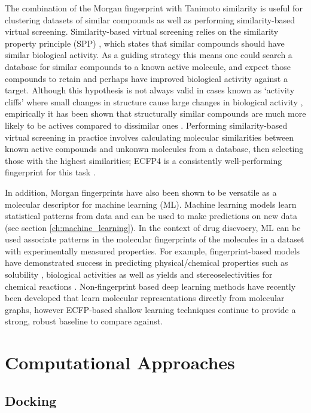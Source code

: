 The combination of the Morgan fingerprint with Tanimoto similarity is useful for clustering \cite{Butina1999Clustering} datasets of similar compounds as well as performing similarity-based virtual screening. Similarity-based virtual screening relies on the  similarity property principle (SPP) \cite{johnson1990concepts}, which states that similar compounds should have similar biological activity. As a guiding strategy this means one could search a database for similar compounds to a known active molecule, and expect those compounds to retain and perhaps have improved biological activity against a target. Although this hypothesis is not always valid in cases known as `activity cliffs' where small changes in structure cause large changes in biological activity \cite{maggiora2006cliffs}, empirically it has been shown that structurally similar compounds are much more likely to be actives compared to dissimilar ones \cite{martin2002similar}. Performing similarity-based virtual screening in practice involves calculating molecular similarities between known active compounds and unkonwn molecules from a database, then selecting those with the highest similarities; ECFP4 is a consistently well-performing fingerprint for this task \cite{riniker2013benchmark, oboyle2016benchmark}.

In addition, Morgan fingerprints have also been shown to be versatile as a molecular descriptor for machine learning (ML). Machine learning models learn statistical patterns from data and can be used to make predictions on new data (see section \ref{ch:machine_learning}). In the context of drug discvoery, ML can be used associate patterns in the molecular fingerprints of the molecules in a dataset with experimentally measured properties. For example, fingerprint-based models have demonstrated success in predicting physical/chemical properties such as solubility \cite{wu2017molnet}, biological activities \cite{Bender2019} as well as yields and stereoselectivities for chemical reactions \cite{sandfort2020yield}. Non-fingerprint based deep learning methods have recently been developed that learn molecular representations directly from molecular graphs, however ECFP-based shallow learning techniques continue to provide a strong, robust baseline to compare against.

\section{Computational Approaches}

\subsection{Docking}

